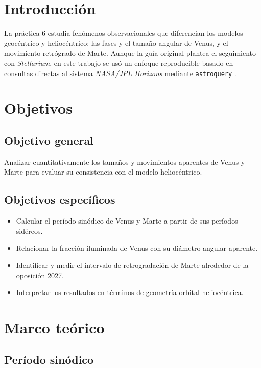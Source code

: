 \section{Introducción}

La práctica 6 estudia fenómenos observacionales que diferencian los modelos
geocéntrico y heliocéntrico: las fases y el tamaño angular de Venus, y el
movimiento retrógrado de Marte.
Aunque la guía original plantea el seguimiento con \textit{Stellarium}, en este
trabajo se usó un enfoque reproducible basado en consultas directas al sistema
\textit{NASA/JPL Horizons} mediante \texttt{astroquery} \citep{Ginsburg2019,Park2021}.

\section{Objetivos}

\subsection{Objetivo general}

Analizar cuantitativamente los tamaños y movimientos aparentes de Venus y Marte
para evaluar su consistencia con el modelo heliocéntrico.

\subsection{Objetivos específicos}

\begin{itemize}
  \item Calcular el período sinódico de Venus y Marte a partir de sus períodos sidéreos.
  \item Relacionar la fracción iluminada de Venus con su diámetro angular aparente.
  \item Identificar y medir el intervalo de retrogradación de Marte alrededor de la oposición 2027.
  \item Interpretar los resultados en términos de geometría orbital heliocéntrica.
\end{itemize}

\section{Marco teórico}

\subsection{Período sinódico}

